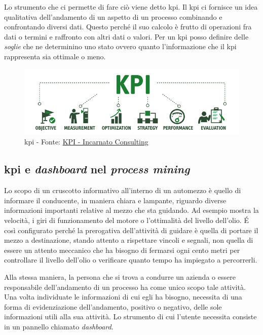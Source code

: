 Lo strumento che ci permette di fare ciò viene detto \acrshort{kpi}. Il \acrlong{kpi} ci fornisce un idea qualitativa dell'andamento di un aspetto di un processo combinando e confrontando diversi dati.
Questo perché il suo calcolo è frutto di operazioni fra dati o termini e raffronto con altri dati o valori.
Per un \acrshort{kpi} posso definire delle \emph{soglie} che ne determinino uno stato ovvero quanto l'informazione che il \acrshort{kpi} rappresenta sia ottimale o meno.
\begin{figure}[H]
    \centering
    \includegraphics[width=0.80\columnwidth]{immagini/kpi.png}
    \caption{\acrshort{kpi} - Fonte: \href{https://incarnato.consulting/kpi-cosa-utilizzarli-nella-tua-impresa/}{KPI - Incarnato Consulting}}
    \label{fig:kpi}
\end{figure}
\newpage
\subsection{\acrshort{kpi} e \textit{dashboard} nel \textit{process mining}}
Lo scopo di un cruscotto informativo all'interno di un automezzo è quello di informare il conducente, in maniera chiara e lampante, riguardo diverse informazioni importanti relative al mezzo che sta guidando. Ad esempio mostra la velocità, i giri di funzionamento del motore o l'ottimalità del livello dell'olio. \'E così configurato perché la prerogativa dell'attività di guidare è quella di portare il mezzo a destinazione, stando attento a rispettare vincoli e segnali, non quella di essere un attento meccanico che ha bisogno di fermarsi ogni cento metri per controllare il livello dell'olio o verificare quanto tempo ha impiegato a percorrerli.

Alla stessa maniera, la persona che si trova a condurre un azienda o essere responsabile dell'andamento di un processo ha come unico scopo tale attività. Una volta individuate le informazioni di cui egli ha bisogno, necessita di una forma di evidenziazione dell'andamento, positivo o negativo, delle sole informazioni utili alla sua attività. Lo strumento di cui l'utente necessita consiste in un pannello chiamato \textit{dashboard}.

